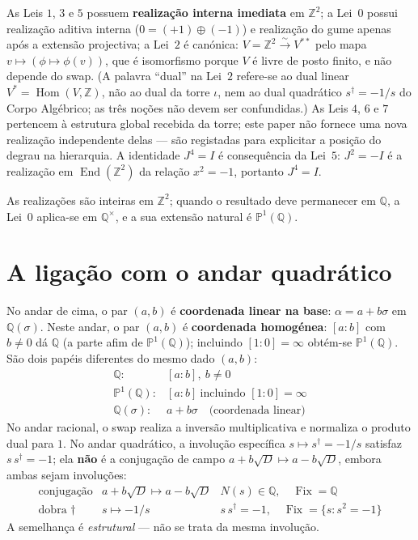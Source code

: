 \documentclass[11pt,a4paper]{article}
\newcommand{\dg}{^{\dagger}}
\begin{document}
\noindent As Leis $1$, $3$ e $5$ possuem \textbf{realização interna imediata}
em $\mathbb{Z}^{2}$; a Lei~$0$ possui realização aditiva interna
($0=(+1)\oplus(-1)$) e realização do gume apenas após a extensão projectiva; a Lei~$2$ é canónica: $V=\mathbb{Z}^{2}\overset{\sim}{\longrightarrow}V^{**}$
pelo mapa $v\mapsto(\phi\mapsto\phi(v))$, que é isomorfismo porque $V$ é livre
de posto finito, e não depende do swap. (A palavra ``dual'' na Lei~$2$ refere-se
ao dual linear $V^{*}=\operatorname{Hom}(V,\mathbb{Z})$, não ao dual da torre
$\iota$, nem ao dual quadrático $s^{\dagger}=-1/s$ do Corpo Algébrico; as três
noções não devem ser confundidas.) As Leis $4$, $6$ e $7$ pertencem à estrutura global recebida da torre; este
paper não fornece uma nova realização independente delas --- são registadas
para explicitar a posição do degrau na hierarquia. A identidade $J^{4}=I$ é consequência da
Lei~$5$: $J^{2}=-I$ é a realização em $\operatorname{End}(\mathbb{Z}^{2})$ da
relação $x^{2}=-1$, portanto $J^{4}=I$.

As realizações são inteiras em $\mathbb{Z}^{2}$; quando o resultado deve
permanecer em $\mathbb{Q}$, a Lei~$0$ aplica-se em $\mathbb{Q}^{\times}$, e a
sua extensão natural é $\mathbb{P}^{1}(\mathbb{Q})$.

\section{A ligação com o andar quadrático}\label{sec:zsigma}

No andar de cima, o par $(a,b)$ é \textbf{coordenada linear na base}:
$\alpha=a+b\sigma$ em $\mathbb{Q}(\sigma)$. Neste andar, o par $(a,b)$ é
\textbf{coordenada homogénea}: $[a:b]$ com $b\neq 0$ dá $\mathbb{Q}$
(a parte afim de $\mathbb{P}^{1}(\mathbb{Q})$); incluindo $[1:0]=\infty$
obtém-se $\mathbb{P}^{1}(\mathbb{Q})$.
São dois papéis diferentes do mesmo dado $(a,b)$:
\[
\boxed{\;
\begin{array}{ll}
\mathbb{Q}: & [a:b],\ b\neq 0\\[3pt]
\mathbb{P}^{1}(\mathbb{Q}): & [a:b]\ \text{incluindo }[1:0]=\infty\\[3pt]
\mathbb{Q}(\sigma): & a+b\sigma \quad\text{(coordenada linear)}
\end{array}\;}
\]
No andar racional, o swap realiza a inversão multiplicativa e normaliza o
produto dual para $1$. No andar quadrático, a involução específica
$s\mapsto s\dg=-1/s$ satisfaz $s\,s\dg=-1$; ela \textbf{não} é a conjugação
de campo $a+b\sqrt{D}\mapsto a-b\sqrt{D}$, embora ambas sejam involuções:
\[
\begin{array}{lll}
\text{conjugação} & a+b\sqrt{D}\mapsto a-b\sqrt{D} & N(s)\in\mathbb{Q},
\quad\operatorname{Fix}=\mathbb{Q}\\[2pt]
\text{dobra }\dagger & s\mapsto -1/s & s\,s\dg=-1,
\quad\operatorname{Fix}=\{s:s^{2}=-1\}
\end{array}
\]
A semelhança é \emph{estrutural} --- não se trata da mesma involução.
\end{document}
